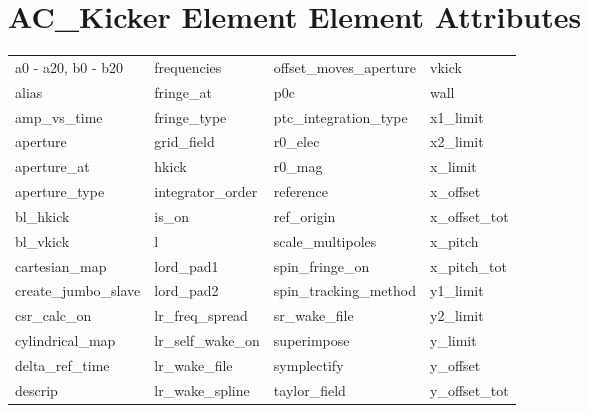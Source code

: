  \section{AC_Kicker Element Element Attributes}
 \label{s:list.ac.kicker}
 
 \begin{tabular}{llll} \toprule
a0 - a20, b0 - b20          & frequencies                 & offset_moves_aperture       & vkick                       \\
alias                       & fringe_at                   & p0c                         & wall                        \\
amp_vs_time                 & fringe_type                 & ptc_integration_type        & x1_limit                    \\
aperture                    & grid_field                  & r0_elec                     & x2_limit                    \\
aperture_at                 & hkick                       & r0_mag                      & x_limit                     \\
aperture_type               & integrator_order            & reference                   & x_offset                    \\
bl_hkick                    & is_on                       & ref_origin                  & x_offset_tot                \\
bl_vkick                    & l                           & scale_multipoles            & x_pitch                     \\
cartesian_map               & lord_pad1                   & spin_fringe_on              & x_pitch_tot                 \\
create_jumbo_slave          & lord_pad2                   & spin_tracking_method        & y1_limit                    \\
csr_calc_on                 & lr_freq_spread              & sr_wake_file                & y2_limit                    \\
cylindrical_map             & lr_self_wake_on             & superimpose                 & y_limit                     \\
delta_ref_time              & lr_wake_file                & symplectify                 & y_offset                    \\
descrip                     & lr_wake_spline              & taylor_field                & y_offset_tot                \\

\end{tabular}
